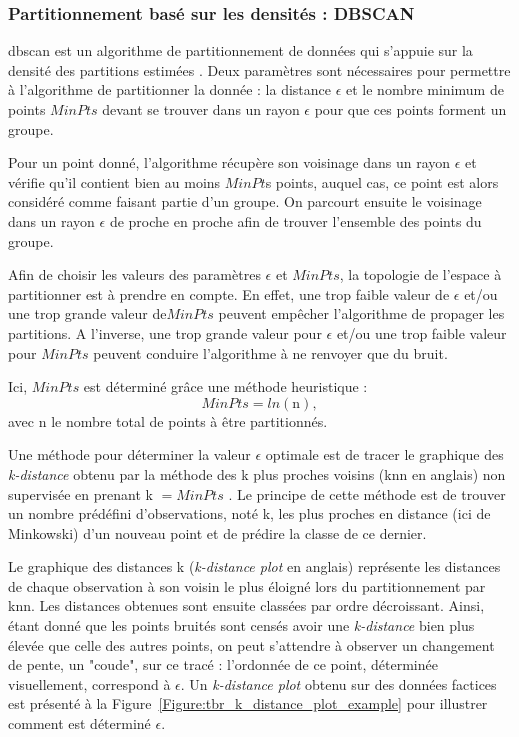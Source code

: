 \subsubsection{Partitionnement basé sur les densités : DBSCAN}
\gls{dbscan} est un algorithme de partitionnement de données qui s'appuie sur la densité des partitions estimées \citep{Ester1996}. 
Deux paramètres sont nécessaires pour permettre à l'algorithme de partitionner la donnée : la distance $\epsilon$ et le nombre minimum de points 
$MinPts$ devant se trouver dans un rayon $\epsilon$ pour que ces points forment un groupe.
 
Pour un point donné, l'algorithme récupère son voisinage dans un rayon $\epsilon$ et vérifie qu'il contient bien au moins $MinPt$s points, auquel cas, 
ce point est alors considéré comme faisant partie d'un groupe. On parcourt ensuite le voisinage 
dans un rayon $\epsilon$ de proche en proche afin de trouver l'ensemble des points du groupe.

Afin de choisir les valeurs des paramètres $\epsilon$ et $MinPts$, la topologie de l'espace à partitionner est à prendre en compte. En effet, une 
trop faible valeur de $\epsilon$  et/ou une trop grande valeur de$MinPts$ peuvent empêcher 
l'algorithme de propager les partitions. A l'inverse, une trop grande valeur pour $\epsilon$  
et/ou une trop faible valeur pour $MinPts$ peuvent conduire l'algorithme à ne renvoyer que du bruit. 
 
Ici, $MinPts$ est déterminé grâce une méthode heuristique \citep{Birant2007} :
\begin{equation}
\label{eq:tbr_dbscan}
MinPts = ln(\text{n}),
\end{equation}
avec n le nombre total de points à être partitionnés.

Une méthode pour déterminer la valeur $\epsilon$ optimale est de tracer le graphique des \textit{k-distance} obtenu par la méthode des k plus proches voisins 
(\gls{knn} en anglais) non supervisée en prenant k $= MinPts$ \citep{Goldberger2005, Ester1996}. Le principe de cette méthode
est de trouver un nombre prédéfini d'observations, noté k, les plus proches en distance (ici de Minkowski) d'un nouveau point et de prédire la classe de ce dernier. 

Le graphique des distances k (\textit{k-distance plot} en anglais) représente les distances de chaque observation à son voisin le plus éloigné 
lors du partitionnement par \gls{knn}. Les distances obtenues sont ensuite classées par ordre décroissant. 
Ainsi, étant donné que les points bruités sont censés avoir une \textit{k-distance} bien plus élevée que celle des autres points, on peut 
s'attendre à observer un changement de pente, un "coude", sur ce tracé : l'ordonnée de ce point, déterminée visuellement, correspond à $\epsilon$. Un \textit{k-distance plot}
obtenu sur des données factices est présenté à la Figure~\ref{Figure:tbr_k_distance_plot_example} pour illustrer comment est déterminé $\epsilon$. 


